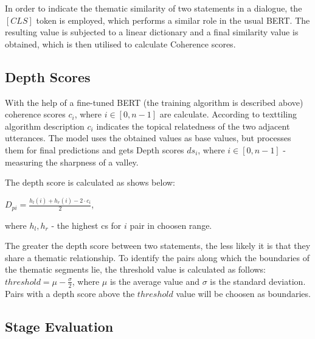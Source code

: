 \documentclass[PMI,VKR]{HSEUniversity}
\begin{document}
In order to indicate the thematic similarity of two statements in a dialogue, the $[CLS]$ token is employed, which performs a similar role in the usual BERT. 
The resulting value is subjected to a linear dictionary and a final similarity value is obtained, which is then utilised to calculate Coherence scores.

\subsection{Depth Scores}

With the help of a fine-tuned BERT (the training algorithm is described above) coherence scores $c_i$, where $i \in [0, n - 1]$ are calculate. According to texttiling algorithm description $c_i$ indicates the topical relatedness of the two adjacent utterances.
The model uses the obtained values as base values, but processes them for final predictions and gets Depth scores $ds_i$, where $i \in [0, n - 1]$  - measuring the sharpness of a valley.

The depth score is calculated as shows below: 
\begin{center}
    $D_{pi} = \frac{h_{l}(i) + h_{r}(i) - 2 \cdot c_{i}}{2}$,
\end{center}
where $h_{l}, h_{r}$ - the highest cs for $i$ pair in choosen range.

The greater the depth score between two statements, the less likely it is that they share a thematic relationship. 
To identify the pairs along which the boundaries of the thematic segments lie, the threshold value is calculated as follows: $threshold = \mu - \frac{\sigma}{2}$, where $\mu$ is the average value and $\sigma$ is the standard deviation. Pairs with a depth score above the $threshold$ value will be choosen as boundaries.

\subsection{Stage Evaluation}
\end{document}
